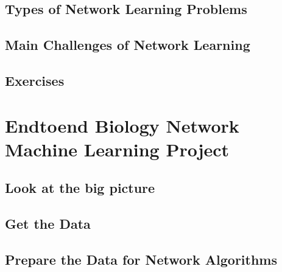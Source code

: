 \documentclass[letterpaper,10pt,english]{jupyterBook}
\begin{document}
\section{Types of Network Learning Problems}
\label{\detokenize{foundations/ch1/types-of-learning-probs:types-of-network-learning-problems}}\label{\detokenize{foundations/ch1/types-of-learning-probs::doc}}

\section{Main Challenges of Network Learning}
\label{\detokenize{foundations/ch1/main-challenges:main-challenges-of-network-learning}}\label{\detokenize{foundations/ch1/main-challenges::doc}}

\section{Exercises}
\label{\detokenize{foundations/ch1/exercises:exercises}}\label{\detokenize{foundations/ch1/exercises::doc}}

\chapter{End\sphinxhyphen{}to\sphinxhyphen{}end Biology Network Machine Learning Project}
\label{\detokenize{foundations/ch2/ch2:end-to-end-biology-network-machine-learning-project}}\label{\detokenize{foundations/ch2/ch2::doc}}

\section{Look at the big picture}
\label{\detokenize{foundations/ch2/big-picture:look-at-the-big-picture}}\label{\detokenize{foundations/ch2/big-picture::doc}}

\section{Get the Data}
\label{\detokenize{foundations/ch2/get-the-data:get-the-data}}\label{\detokenize{foundations/ch2/get-the-data::doc}}

\section{Prepare the Data for Network Algorithms}
\label{\detokenize{foundations/ch2/prepare-the-data:prepare-the-data-for-network-algorithms}}\label{\detokenize{foundations/ch2/prepare-the-data::doc}}
\end{document}
